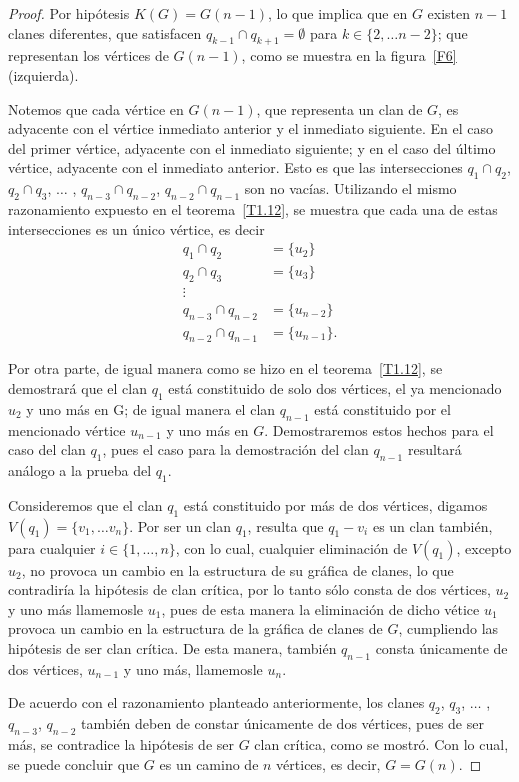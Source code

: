 \documentclass[12pt]{book}
\theoremstyle{definition}
\begin{document}
\begin{proof}
Por hipótesis $K(G)=G(n-1)$, lo que implica que en $G$ existen $n-1$ clanes diferentes, que satisfacen $q_{k-1}\cap q_{k+1}=\emptyset$ para $k\in\{2,\dots n-2\}$; que representan los vértices de $G(n-1)$, como se muestra en la figura~\ref{F6} (izquierda).

Notemos que cada vértice en $G(n-1)$, que representa un clan de $G$, es adyacente con el vértice inmediato anterior y el inmediato siguiente. En el caso del primer vértice, adyacente con el inmediato siguiente; y en el caso del último vértice, adyacente con el inmediato anterior. Esto es que las intersecciones $q_1\cap q_2$, $q_2\cap q_3$, $\dots$ , $q_{n-3}\cap q_{n-2}$, $q_{n-2}\cap q_{n-1}$ son no vacías. Utilizando el mismo razonamiento expuesto en el teorema~\ref{T1.12}, se muestra que cada una de estas intersecciones es un único vértice, es decir
\begin{equation*}
\begin{aligned}
q_1\cap q_2 &= \{u_2\} \\
q_2\cap q_3 &= \{u_3\} \\
\vdots \\
q_{n-3}\cap q_{n-2} &= \{u_{n-2}\} \\
q_{n-2}\cap q_{n-1} &= \{u_{n-1}\}.
\end{aligned}
\end{equation*}

Por otra parte, de igual manera como se hizo en el teorema~\ref{T1.12}, se demostrará que el clan $q_1$ está constituido de solo dos vértices, el ya mencionado $u_2$ y uno más en G; de igual manera el clan $q_{n-1}$ está constituido por el mencionado vértice $u_{n-1}$ y uno más en $G$. Demostraremos estos hechos para el caso del clan $q_1$, pues el caso para la demostración del clan $q_{n-1}$ resultará análogo a la prueba del $q_1$. 

Consideremos que el clan $q_1$ está constituido por más de dos vértices, digamos $V(q_1)=\{v_1,\dots v_n\}$. Por ser un clan $q_1$, resulta que $q_1-v_i$ es un clan también, para cualquier $i\in \{1,\dots,n\}$, con lo cual, cualquier eliminación de $V(q_1)$, excepto $u_2$, no provoca un cambio en la estructura de su gráfica de clanes, lo que contradiría la hipótesis de clan crítica, por lo tanto sólo consta de dos vértices, $u_2$ y uno más llamemosle $u_1$, pues de esta manera la eliminación de dicho vétice $u_1$ provoca un cambio en la estructura de la gráfica de clanes de $G$, cumpliendo las hipótesis de ser clan crítica. 
De esta manera, también $q_{n-1}$ consta únicamente de dos vértices, $u_{n-1}$ y uno más, llamemosle $u_n$.

De acuerdo con el razonamiento planteado anteriormente, los clanes $q_2$, $q_3$, $\dots$ , $q_{n-3}$, $q_{n-2}$ también deben de constar únicamente de dos vértices, pues de ser más, se contradice la hipótesis de ser $G$ clan crítica, como se mostró. Con lo cual, se puede concluir que $G$ es un camino de $n$ vértices, es decir, $G=G(n)$.
\end{proof}
\end{document}
